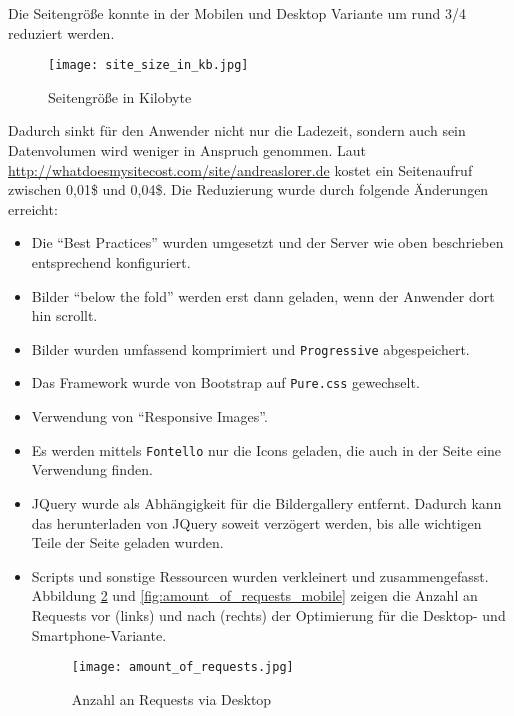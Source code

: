     Die Seitengröße konnte in der Mobilen und Desktop Variante um rund 3/4 reduziert werden.
		\begin{figure}[htbp]
			\begin{center}
				\texttt{[image: site\_size\_in\_kb.jpg]}
				\caption{Seitengröße in Kilobyte}
				\label{fig:site_size_in_kb}
			\end{center}
		\end{figure}

		Dadurch sinkt für den Anwender nicht nur die Ladezeit, sondern auch sein Datenvolumen wird weniger in Anspruch genommen. Laut \url{http://whatdoesmysitecost.com/site/andreaslorer.de} kostet ein Seitenaufruf zwischen 0,01\$ und 0,04\$. Die Reduzierung wurde durch folgende Änderungen erreicht: 

		\begin{itemize}
			\item Die "`Best Practices"' wurden umgesetzt und der Server wie oben beschrieben entsprechend konfiguriert.

			\item Bilder "`below the fold"' werden erst dann geladen, wenn der Anwender dort hin scrollt.

			\item Bilder wurden umfassend komprimiert und \texttt{Progressive} abgespeichert.

			\item Das Framework wurde von Bootstrap auf \texttt{Pure.css} gewechselt.

			\item Verwendung von "`Responsive Images"'.

			\item Es werden mittels \texttt{Fontello} nur die Icons geladen, die auch in der Seite eine Verwendung finden.

			\item JQuery wurde als Abhängigkeit für die Bildergallery entfernt. Dadurch kann das herunterladen von JQuery soweit verzögert werden, bis alle wichtigen Teile der Seite geladen wurden. 

			\item Scripts und sonstige Ressourcen wurden verkleinert und zusammengefasst. Abbildung \ref{fig:amount_of_requests} und \ref{fig:amount_of_requests_mobile} zeigen die Anzahl an Requests vor (links) und nach (rechts) der Optimierung für die Desktop- und Smartphone-Variante.

			\begin{figure}[htbp]
				\begin{center}
					\texttt{[image: amount\_of\_requests.jpg]}
					\caption{Anzahl an Requests via Desktop}
					\label{fig:amount_of_requests}
				\end{center}
			\end{figure}


\end{itemize}
